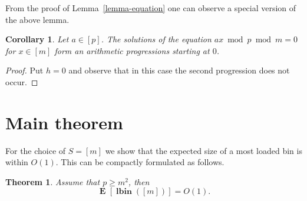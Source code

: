 \documentclass{article}
\newcommand{\vlbin}[1]{\operatorname{\mathbf{lbin}}({#1})}
\newcommand{\expects}[2]{\operatorname{\mathbf{E}}_{{#1}}\left[{#2}\right]}
\newcommand{\expect}[1]{\expects{}{#1}}
\newtheorem{theorem}{Theorem}
\newtheorem{corollary}{Corollary}
\begin{document}
From the proof of Lemma~\ref{lemma-equation} one can observe a special version of the above lemma.
\begin{corollary}
Let $a \in [p]$. The solutions of the equation $ax \bmod p \bmod m = 0$ for $x \in [m]$ form an arithmetic progressions starting at $0$.
\end{corollary}
\begin{proof}
Put $h = 0$ and observe that in this case the second progression does not occur.
\end{proof}

\section{Main theorem}

For the choice of $S = [m]$ we show that the expected size of a most loaded bin is within $O(1)$. 
This can be compactly formulated as follows.
\begin{theorem}
\label{thm:interval-constant}
Assume that $p \geq m^2$, then
\[
\expect{\vlbin{[m]}} = O(1).
\]
\end{theorem}
\end{document}
